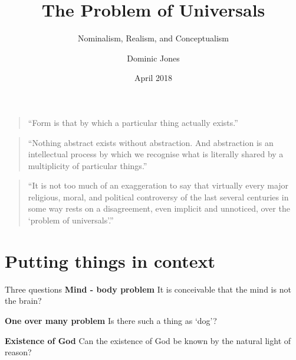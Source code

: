 \documentclass[xcolor=dvipsnames]{beamer}
\title{The Problem of Universals}
\subtitle{Nominalism, Realism, and Conceptualism}
\author{Dominic Jones}
\date{April 2018}
\begin{document}
\begin{frame}[plain]
  \titlepage
\end{frame}


\begin{frame}{}
  \begin{quote}
    ``Form is that by which a particular thing actually exists.''
  \end{quote}
      \hspace*{10cm}{A.}
\end{frame}


\begin{frame}{}
  \begin{quote}
    ``Nothing abstract exists without abstraction. And abstraction is an intellectual process by which we recognise what is literally shared by a multiplicity of particular things.''
  \end{quote}
      \hspace*{10cm}{D.S.O.}
\end{frame}


\begin{frame}{}
  \begin{quote}
    ``It is not too much of an exaggeration to say that virtually every major religious, moral, and political controversy of the last several centuries in some way rests on a disagreement, even implicit and unnoticed, over the {`problem of universals'}.''
  \end{quote}
      \hspace*{10cm}{E.F.}
\end{frame}


\section{Putting things in context}


\begin{frame}{Three questions}
\textbf{Mind - body problem}\newline
It is conceivable that the mind is not the brain? \vspace{10mm}

\textbf{One over many problem}\newline
Is there such a thing as `dog'? \vspace{10mm}

\textbf{Existence of God}\newline
Can the existence of God be known by the natural light of reason? \vspace{10mm}
\end{frame}
\end{document}
